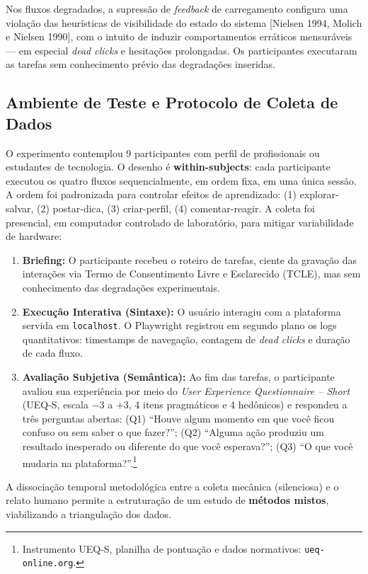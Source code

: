 \documentclass[12pt]{article}
\begin{document}
Nos fluxos degradados, a supressão de \textit{feedback} de carregamento configura uma violação das heurísticas de visibilidade do estado do sistema [Nielsen 1994, Molich e Nielsen 1990], com o intuito de induzir comportamentos erráticos mensuráveis --- em especial \textit{dead clicks} e hesitações prolongadas. Os participantes executaram as tarefas sem conhecimento prévio das degradações inseridas.

\subsection{Ambiente de Teste e Protocolo de Coleta de Dados}

O experimento contemplou 9 participantes com perfil de profissionais ou estudantes de tecnologia. O desenho é \textbf{within-subjects}: cada participante executou os quatro fluxos sequencialmente, em ordem fixa, em uma única sessão. A ordem foi padronizada para controlar efeitos de aprendizado: (1) explorar-salvar, (2) postar-dica, (3) criar-perfil, (4) comentar-reagir. A coleta foi presencial, em computador controlado de laboratório, para mitigar variabilidade de hardware:

\begin{enumerate}
    \item \textbf{Briefing:} O participante recebeu o roteiro de tarefas, ciente da gravação das interações via Termo de Consentimento Livre e Esclarecido (TCLE), mas sem conhecimento das degradações experimentais.
    \item \textbf{Execução Interativa (Sintaxe):} O usuário interagiu com a plataforma servida em \texttt{localhost}. O Playwright registrou em segundo plano os logs quantitativos: timestamps de navegação, contagem de \textit{dead clicks} e duração de cada fluxo.
    \item \textbf{Avaliação Subjetiva (Semântica):} Ao fim das tarefas, o participante avaliou sua experiência por meio do \textit{User Experience Questionnaire -- Short} (UEQ-S, escala $-3$ a $+3$, 4 itens pragmáticos e 4 hedônicos) e respondeu a três perguntas abertas: (Q1) ``Houve algum momento em que você ficou confuso ou sem saber o que fazer?''; (Q2) ``Alguma ação produziu um resultado inesperado ou diferente do que você esperava?''; (Q3) ``O que você mudaria na plataforma?''.\footnote{Instrumento UEQ-S, planilha de pontuação e dados normativos: \texttt{ueq-online.org}.}
\end{enumerate}

A dissociação temporal metodológica entre a coleta mecânica (silenciosa) e o relato humano permite a estruturação de um estudo de \textbf{métodos mistos}, viabilizando a triangulação dos dados.
\end{document}
